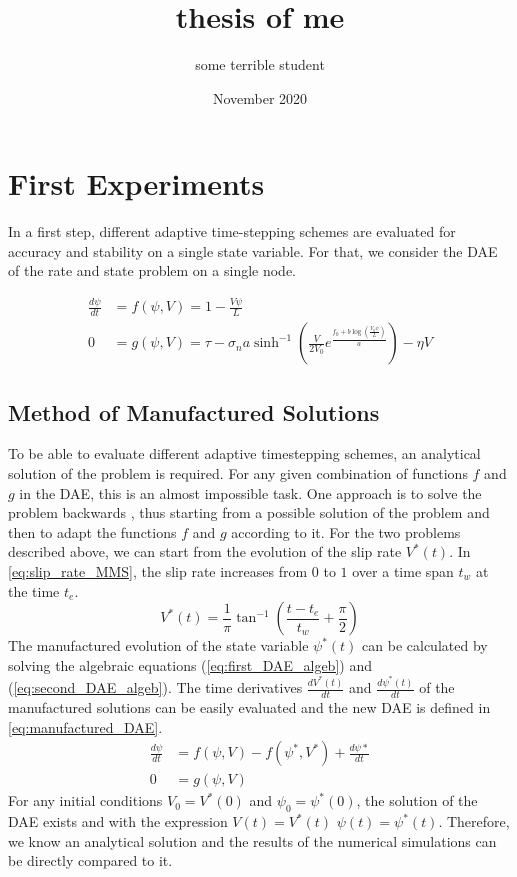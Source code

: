 \documentclass{report}
\title{thesis of me}
\author{some terrible student}
\date{November 2020}
\begin{document}
\maketitle

\chapter{First Experiments}
In a first step, different adaptive time-stepping schemes are evaluated for accuracy and stability on a single state variable. For that, we consider the DAE of the rate and state problem on a single node.  
    

\begin{align}
    \label{eq:first_DAE_ODE}
    \frac{d\psi}{dt} &= f(\psi,V) = 1 - \frac{V\psi}{L} \\
    \label{eq:first_DAE_algeb}
    0 &= g(\psi,V) = \tau - \sigma_na\sinh^{-1}\left(\frac{V}{2V_0}e^{\frac{f_0 + b\log\left(\frac{V_0\psi}{L}\right)}{a}}\right)-\eta V
\end{align}

\section{Method of Manufactured Solutions}
To be able to evaluate different adaptive timestepping schemes, an analytical solution of the problem is required. For any given combination of functions $f$ and $g$ in the DAE, this is an almost impossible task. One approach is to solve the problem backwards \cite{10.1115/1.1436090}, thus starting from a possible solution of the problem and then to adapt the functions $f$ and $g$ according to it. For the two problems described above, we can start from the evolution of the slip rate $V^*(t)$. In \autoref{eq:slip_rate_MMS}, the slip rate increases from $0$ to $1$ over a time span $t_w$ at the time $t_e$.
\begin{equation}  
    \label{eq:slip_rate_MMS}
    V^*(t) = \frac{1}{\pi}\tan^{-1}\left(\frac{t-t_e}{t_w} + \frac{\pi}{2}\right)
\end{equation}
The manufactured evolution of the state variable $\psi^*(t)$ can be calculated by solving the algebraic equations (\ref{eq:first_DAE_algeb}) and (\ref{eq:second_DAE_algeb}). The time derivatives $\frac{dV^*(t)}{dt}$ and $\frac{d\psi^*(t)}{dt}$ of the manufactured solutions can be easily evaluated and the new DAE is defined in \autoref{eq:manufactured_DAE}.
\begin{align}
    \label{eq:manufactured_DAE}
    \frac{d\psi}{dt} &= f(\psi,V) - f(\psi^*,V^*) + \frac{d\psi*}{dt} \\
    0 &= g(\psi, V) 
\end{align}
For any initial conditions $V_0 = V^*(0)$ and $\psi_0 = \psi^*(0)$, the solution of the DAE exists and with the expression $V(t) = V^*(t)$ $\psi(t) = \psi^*(t)$. Therefore, we know an analytical solution and the results of the numerical simulations can be directly compared to it. 
\end{document}
